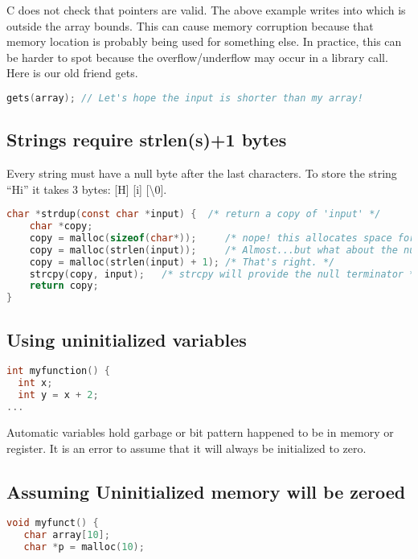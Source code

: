 C does not check that pointers are valid. The above example writes into  which is outside the array bounds. This can cause memory corruption because that memory location is probably being used for something else.
In practice, this can be harder to spot because the overflow/underflow may occur in a library call.
Here is our old friend gets.

\begin{lstlisting}[language=C]
gets(array); // Let's hope the input is shorter than my array!
\end{lstlisting}


\subsection{Strings require strlen(s)+1 bytes}

Every string must have a null byte after the last characters. To store
the string ``Hi'' it takes 3 bytes: [H] [i] [\backslash 0].

\begin{lstlisting}[language=C]
  char *strdup(const char *input) {  /* return a copy of 'input' */
    char *copy;
    copy = malloc(sizeof(char*));     /* nope! this allocates space for a pointer, not a string */
    copy = malloc(strlen(input));     /* Almost...but what about the null terminator? */
    copy = malloc(strlen(input) + 1); /* That's right. */
    strcpy(copy, input);   /* strcpy will provide the null terminator */
    return copy;
}
\end{lstlisting}

\subsection{Using uninitialized variables}

\begin{lstlisting}[language=C]
int myfunction() {
  int x;
  int y = x + 2;
...
\end{lstlisting}

Automatic variables hold garbage or bit pattern happened to be in memory or register.
It is an error to assume that it will always be initialized to zero.

\subsection{Assuming Uninitialized memory will be zeroed}

\begin{lstlisting}[language=C]
void myfunct() {
   char array[10];
   char *p = malloc(10);
\end{lstlisting}

